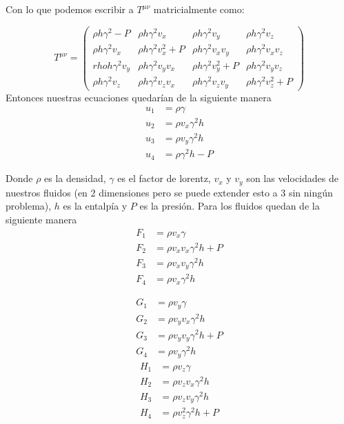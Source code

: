 \documentclass[12pt,a4paper]{book}
\begin{document}
Con lo que podemos escribir a $T^{\mu \nu}$ matricialmente como:

\begin{equation}
T^{\mu \nu} =
\begin{pmatrix}
\rho h \gamma^2-P & \rho h \gamma^2 v_{x}  & \rho h \gamma^2 v_{y} & \rho h \gamma^2 v_{z} \\

\rho h \gamma^2 v_{x} & \rho h \gamma^2 v_{x}^{2}+P & \rho h \gamma^2 v_{x}v_{y} &  \rho h \gamma^2 v_{x}v_{z} \\

rho h \gamma^2 v_{y} & \rho h \gamma^2 v_{y}v_{x} & \rho h \gamma^2 v_{y}^{2}+P & \rho h \gamma^2 v_{y}v_{z}\\

\rho h \gamma^2 v_{z} & \rho h \gamma^2 v_{z}v_{x} & \rho h \gamma^2 v_{z}v_{y} & \rho h \gamma^2 v_{z}^2 + P
   
\end{pmatrix}
\end{equation}
Entonces nuestras ecuaciones quedarían de la siguiente manera
\begin{align}
u_{1}& = \rho \gamma \\ 
u_{2}& = \rho v_{x} \gamma^{2} h \\ 
u_{3}& = \rho v_{y} \gamma^{2} h \\ 
u_{4}& = \rho \gamma^{2} h - P 
\end{align}

Donde $\rho$ es la densidad, $\gamma$ es el factor de lorentz, $v_{x}$ y $v_{y}$ son las velocidades de nuestros fluidos (en 2 dimensiones pero se puede extender esto a 3 sin ningún problema), $h$ es la entalpía  y $P$ es la presión. Para los fluidos quedan de la siguiente manera
\begin{align}
F_{1}& = \rho v_{x} \gamma \\ 
F_{2}& = \rho v_{x} v_{x} \gamma^{2} h + P\\ 
F_{3}& = \rho v_{x} v_{y} \gamma^{2} h \\ 
F_{4}& = \rho v_{x} \gamma^{2} h 
\end{align}

\begin{align}
G_{1}& = \rho v_{y} \gamma \\ 
G_{2}& = \rho v_{y} v_{x} \gamma^{2} h \\ 
G_{3}& = \rho v_{y} v_{y} \gamma^{2} h + P\\ 
G_{4}& = \rho v_{y} \gamma^{2} h
\end{align}
\begin{align}
H_{1}& = \rho v_{z} \gamma \\ 
H_{2}& = \rho v_{z} v_{x} \gamma^{2} h \\ 
H_{3}& = \rho v_{z} v_{y} \gamma^{2} h \\ 
H_{4}& = \rho v_{z}^{2} \gamma^{2} h + P
\end{align}
\end{document}
